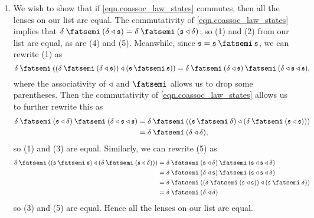 \documentclass[Book-Poly]{subfiles}
\begin{document}
\begin{exercise}
\begin{solution}
\begin{enumerate}
    \item We wish to show that if \eqref{eqn.coassoc_law_states} commutes, then all the lenses on our list are equal.
    The commutativity of \eqref{eqn.coassoc_law_states} implies that $\delta\then(\delta\tri\ema{s})=\delta\then(\ema{s}\tri\delta)$; so (1) and (2) from our list are equal, as are (4) and (5).
    Meanwhile, since $\ema{s}=\ema{s}\then\ema{s}$, we can rewrite (1) as
    \[
        \delta\then((\delta\then(\delta\tri\ema{s}))\tri(\ema{s}\then\ema{s}))=\delta\then(\delta\tri\ema{s})\then(\delta\tri\ema{s}\tri\ema{s}),
    \]
    where the associativity of $\mathbin{\triangleleft}$ and $\then$ allows us to drop some parentheses.
    Then the commutativity of \eqref{eqn.coassoc_law_states} allows us to further rewrite this as
    \begin{align*}
        \delta\then(\ema{s}\tri\delta)\then(\delta\tri\ema{s}\tri\ema{s})&=\delta\then((\ema{s}\then\delta)\tri(\delta\then(\ema{s}\tri\ema{s})))\\
        &=\delta\then(\delta\tri\delta),
    \end{align*}
    so (1) and (3) are equal.
    Similarly, we can rewrite (5) as
    \begin{align*}
        \delta\then((\ema{s}\then\ema{s})\tri(\delta\then(\ema{s}\tri\delta)))&=\delta\then(\ema{s}\tri\delta)\then(\ema{s}\tri\ema{s}\tri\delta)\\
        &=\delta\then(\delta\tri\ema{s})\then(\ema{s}\tri\ema{s}\tri\delta)\\
        &=\delta\then((\delta\then(\ema{s}\tri\ema{s}))\tri(\ema{s}\then\delta))\\
        &=\delta\then(\delta\tri\delta)
    \end{align*}
    so (3) and (5) are equal.
    Hence all the lenses on our list are equal.
\end{enumerate}
\end{solution}
\end{exercise}
\end{document}
